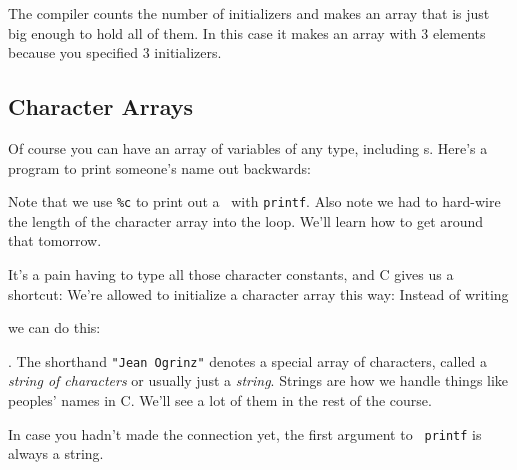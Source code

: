 \begin{flushleft}
\verb% int n[] = { 1, 3, 5}; %
\end{flushleft}

The compiler counts the number of initializers and makes an array that
is just big enough to hold all of them.  In this case it makes an array
with 3 elements because you specified 3 initializers.

\subsection{Character Arrays}

Of course you can have an array of variables of any type, including \chr
s.  Here's a program to print someone's name out backwards:



Note that we use {\tt\%c} to print out a \chr\  with {\tt printf}.  Also
note we had to hard-wire the length of the character array into the
loop.  We'll learn how to get around that tomorrow.

It's a pain having to type all those character constants, and C gives us
a shortcut:  We're allowed to initialize a character array this way:
Instead of writing

\begin{flushleft}
\verb%char name[] = { 'J', 'e', 'a', 'n', ' ', 'O', 'g', 'r', 'i', 'n', 'z' };%
\end{flushleft}

\noindent we can do this:

\begin{flushleft}
\verb%char name[] = "Jean Ogrinz";%
\end{flushleft}

\noindent .  The shorthand {\tt "Jean Ogrinz"} denotes a special array of
characters, called a {\em string of characters}\/ or usually just a {\em
string}\/.  Strings are how we handle things like peoples' names in C.
We'll see a lot of them in the rest of the course.  

In case you hadn't made the connection yet, the first argument to {\tt
printf} is always a string.



